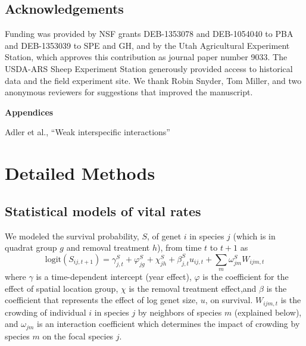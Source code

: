 \documentclass[11pt]{article}
\begin{document}
\begin{doublespacing}
\section*{Acknowledgements}
Funding was provided by NSF grants DEB-1353078 and DEB-1054040 to PBA and DEB-1353039 to SPE and GH, and 
by the Utah Agricultural Experiment Station, which approves this contribution as journal paper number 9033. 
The USDA-ARS Sheep Experiment Station generously provided access to historical data and the field experiment site. 
We thank Robin Snyder, Tom Miller, and two anonymous reviewers for suggestions that improved the manuscript.

\newpage
\renewcommand{\refname}{Literature cited}



\end{doublespacing} 


\clearpage 
\newpage 

\setcounter{page}{1}
\setcounter{equation}{0}
\setcounter{figure}{0}
\setcounter{section}{0}
\setcounter{table}{0}

\centerline{\Large \textbf{Appendices}}
\centerline{Adler et al., ``Weak interspecific interactions''} 

\vspace{0.4in} 

\renewcommand{\theequation}{A-\arabic{equation}}
\renewcommand{\thetable}{A-\arabic{table}}
\renewcommand{\thefigure}{A-\arabic{figure}}
\renewcommand{\thesection}{\Alph{section}}

\section{Detailed Methods} 
\label{AppendixA}

\subsection{Statistical models of vital rates}

We modeled the survival probability, $S$, of genet $i$ in species $j$ (which is in quadrat group $g$ and removal treatment $h$), 
from time $t$ to $t+1$  as
\begin{equation}
\mbox{logit}(S_{ij,t+1}) = \gamma_{j,t}^S + \varphi_{jg}^S+  \chi_{jh}^S  + \beta_{j,t}^S u_{ij,t} +  
\sum \limits_{m} \omega_{jm}^S {W}_{ijm,t}
\label{eqn:survReg}
\end{equation}
where $\gamma$ is a time-dependent intercept (year effect), $\varphi$ is the coefficient for the 
effect of spatial location group, $\chi$ is the removal treatment effect,and  $\beta$ is the coefficient that 
represents the effect of log genet size, $u$, on survival. 
$W_{ijm,t}$ is the crowding of individual $i$ in species $j$ by neighbors of species $m$ (explained below), and 
$\omega_{jm}$ is an interaction coefficient which determines the impact of crowding by species $m$ on the focal species $j$. 
\end{document}
